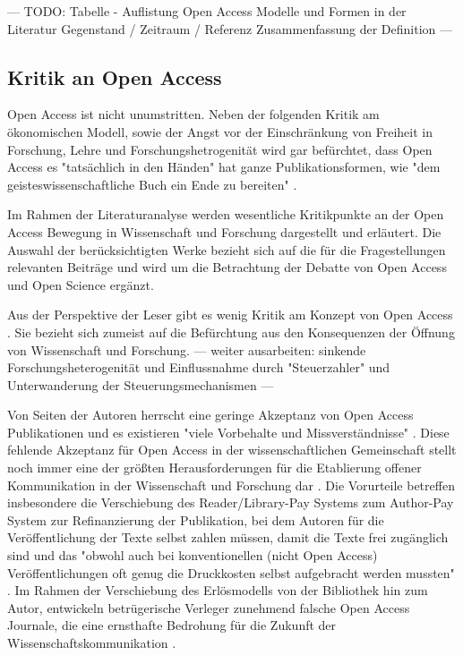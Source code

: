--- TODO: Tabelle - Auflistung Open Access  Modelle und Formen in der Literatur Gegenstand / Zeitraum / Referenz Zusammenfassung der Definition ---

\subsection{Kritik an Open Access}

Open Access ist nicht unumstritten. Neben der folgenden Kritik am ökonomischen Modell, sowie der Angst vor der Einschränkung von Freiheit in Forschung, Lehre und Forschungshetrogenität wird gar befürchtet, dass Open Access es "tatsächlich in den Händen" hat ganze Publikationsformen, wie "dem geisteswissenschaftliche Buch ein Ende zu bereiten" \cite{Hirschi_2015_buch_oa}.

Im Rahmen der Literaturanalyse werden wesentliche Kritikpunkte an der Open Access Bewegung in Wissenschaft und Forschung dargestellt und erläutert. Die Auswahl der berücksichtigten Werke bezieht sich auf die für die Fragestellungen relevanten Beiträge und wird um die Betrachtung der Debatte von Open Access und Open Science ergänzt.

Aus der Perspektive der Leser gibt es wenig Kritik am Konzept von Open Access \cite{weishaupt_2009_goldenOA}. Sie bezieht sich zumeist auf die Befürchtung aus den Konsequenzen der Öffnung von Wissenschaft und Forschung.
--- weiter ausarbeiten: sinkende Forschungsheterogenität und Einflussnahme durch "Steuerzahler" und Unterwanderung der Steuerungsmechanismen ---

Von Seiten der Autoren herrscht eine geringe Akzeptanz von Open Access Publikationen und es existieren "viele Vorbehalte und Missverständnisse" \cite{Suber_2002}. Diese fehlende Akzeptanz für Open Access in der wissenschaftlichen Gemeinschaft stellt noch immer eine der größten Herausforderungen für die Etablierung offener Kommunikation in der Wissenschaft und Forschung dar \cite{weishaupt_2009_goldenOA}. Die Vorurteile betreffen insbesondere die Verschiebung des Reader/Library-Pay Systems zum Author-Pay System \cite{EuropeanCommission_sciencepub_2006} \cite{Chibnik_2015} zur Refinanzierung der Publikation, bei dem Autoren für die Veröffentlichung der Texte selbst zahlen müssen, damit die Texte frei zugänglich sind \cite{Mussell_2013} und das "obwohl auch bei konventionellen (nicht Open Access) Veröffentlichungen oft genug die Druckkosten selbst aufgebracht werden mussten" \cite{weishaupt_2009_goldenOA}. Im Rahmen der Verschiebung des Erlösmodells von der Bibliothek hin zum Autor, entwickeln betrügerische Verleger zunehmend falsche Open Access Journale, die eine ernsthafte Bedrohung für die Zukunft der Wissenschaftskommunikation \cite{Beall_2012}.


